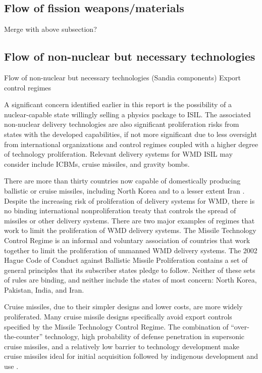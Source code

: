 \documentclass{report}
\begin{document}
 
 \subsection{Flow of fission weapons/materials}

Merge with above subsection?


\subsection{Flow of non-nuclear but necessary technologies}

Flow of non-nuclear but necessary technologies (Sandia components)
Export control regimes

A significant concern identified earlier in this report is the possibility of a nuclear-capable state willingly selling a physics package to ISIL. The associated non-nuclear delivery technologies are also significant proliferation risks from states with the developed capabilities, if not more significant due to less oversight from international organizations and control regimes coupled with a higher degree of technology proliferation. Relevant delivery systems for WMD ISIL may consider include ICBMs, cruise missiles, and gravity bombs. 

There are more than thirty countries now capable of domestically producing ballistic or cruise missiles, including North Korea and to a lesser extent Iran \cite{U.S.CongressOfficeofTechnology1993}. Despite the increasing risk of proliferation of delivery systems for WMD, there is no binding international nonproliferation treaty that controls the spread of missiles or other delivery systems. There are two major examples of regimes that work to limit the proliferation of WMD delivery systems. The Missile Technology Control Regime is an informal and voluntary association of countries that work together to limit the proliferation of unmanned WMD delivery systems. The 2002 Hague Code of Conduct against Ballistic Missile Proliferation contains a set of general principles that its subscriber states pledge to follow. Neither of these sets of rules are binding, and neither include the states of most concern: North Korea, Pakistan, India, and Iran.

Cruise missiles, due to their simpler designs and lower costs, are more widely proliferated. Many cruise missile designs specifically avoid export controls specified by the Missile Technology Control Regime. The combination of \enquote{over-the-counter} technology, high probability of defense penetration in supersonic cruise missiles, and a relatively low barrier to technology development make cruise missiles ideal for initial acquisition followed by indigenous development and use \cite{OfficeoftheUnderSecretaryofDefenseforAcquisitionandTechnology1998}. 
\end{document}
